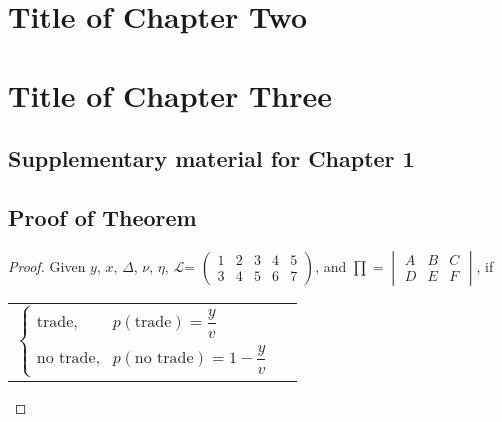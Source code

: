 \documentclass[letterpaper]{report}
\begin{document}
\chapter{Title of Chapter Two}


\chapter{Title of Chapter Three}


\onehalfspacing


\begin{appendices}
  \doublespacing
  
  \chapter{Supplementary material for  Chapter 1}
  
  \section{Proof of Theorem}
  
  \begin{proof} 
    
    Given $y$, $x$, $\Delta$, $\nu$, $\eta$, $\mathcal{L}$=
    $\begin{pmatrix}
    1 & 2 & 3 & 4 & 5 \\
    3 & 4 & 5 & 6 & 7
    \end{pmatrix}$,
    and $\prod=\begin{vmatrix}
    A &B  &C \\
    D&  E& F
    \end{vmatrix}$, if
    
    \begin{center}
      \begin{tabular}{ll}
        $\begin{cases}
        \text{trade}, & p(\text{trade})=\dfrac{y}{v}\\
        \text{no trade}, & p(\text{no trade})=1-\dfrac{y}{v}
        \end{cases}$\\
      \end{tabular}
    \end{center}
    

\end{proof}
\end{appendices}
\end{document}
